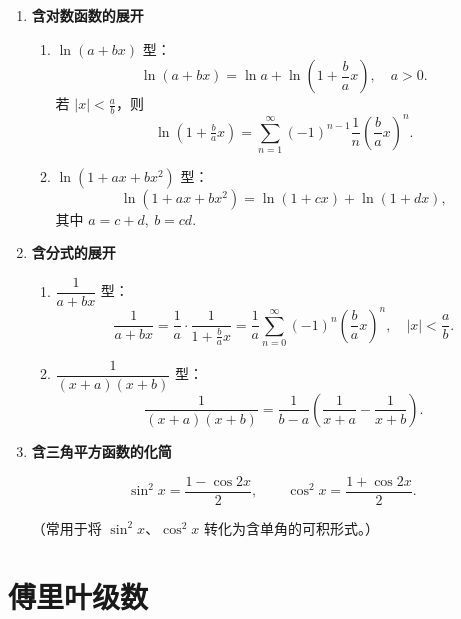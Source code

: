 \begin{enumerate}
    \item \textbf{含对数函数的展开}

          \begin{enumerate}
              \item $\ln(a + bx)$ 型：
                    \[
                        \ln(a + bx) = \ln a + \ln\left(1 + \frac{b}{a}x\right), \quad a > 0.
                    \]
                    若 $|x| < \frac{a}{b}$，则
                    \[
                        \ln(1 + \tfrac{b}{a}x) = \sum_{n=1}^{\infty}(-1)^{n-1}\frac{1}{n}\left(\frac{b}{a}x\right)^n.
                    \]
              \item $\ln(1 + ax + bx^2)$ 型：
                    \[
                        \ln(1 + ax + bx^2)
                        = \ln(1 + cx) + \ln(1 + dx),
                    \]
                    其中 $a = c + d,\ b = cd.$
          \end{enumerate}

    \item \textbf{含分式的展开}

          \begin{enumerate}
              \item $\dfrac{1}{a + bx}$ 型：
                    \[
                        \frac{1}{a + bx}
                        = \frac{1}{a} \cdot \frac{1}{1 + \frac{b}{a}x}
                        = \frac{1}{a}\sum_{n=0}^{\infty}(-1)^n\left(\frac{b}{a}x\right)^n, \quad |x| < \frac{a}{b}.
                    \]
              \item $\dfrac{1}{(x+a)(x+b)}$ 型：
                    \[
                        \frac{1}{(x+a)(x+b)}
                        = \frac{1}{b - a}\left(\frac{1}{x+a} - \frac{1}{x+b}\right).
                    \]
          \end{enumerate}

    \item \textbf{含三角平方函数的化简}

          \[
              \sin^2x = \frac{1 - \cos 2x}{2}, \qquad
              \cos^2x = \frac{1 + \cos 2x}{2}.
          \]

          （常用于将 $\sin^2 x$、$\cos^2 x$ 转化为含单角的可积形式。）
\end{enumerate}

\section{傅里叶级数}

